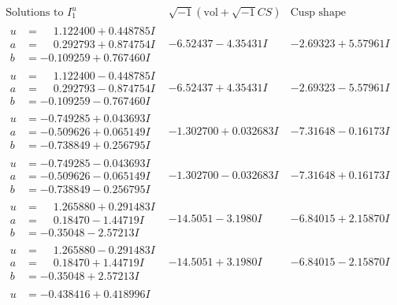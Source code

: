 \documentclass[1p]{elsarticle_modified}
\theoremstyle{definition}
\newcommand{\I}{\sqrt{-1}}
\begin{document}
$$\begin{array}{c|c|c}  
\text{Solutions to }I^u_{1}& \I (\text{vol} + \sqrt{-1}CS) & \text{Cusp shape}\\
 \hline 
\begin{aligned}
u &= \phantom{-}1.122400 + 0.448785 I \\
a &= \phantom{-}0.292793 + 0.874754 I \\
b &= -0.109259 + 0.767460 I\end{aligned}
 & -6.52437 - 4.35431 I & -2.69323 + 5.57961 I \\ \hline\begin{aligned}
u &= \phantom{-}1.122400 - 0.448785 I \\
a &= \phantom{-}0.292793 - 0.874754 I \\
b &= -0.109259 - 0.767460 I\end{aligned}
 & -6.52437 + 4.35431 I & -2.69323 - 5.57961 I \\ \hline\begin{aligned}
u &= -0.749285 + 0.043693 I \\
a &= -0.509626 + 0.065149 I \\
b &= -0.738849 + 0.256795 I\end{aligned}
 & -1.302700 + 0.032683 I & -7.31648 - 0.16173 I \\ \hline\begin{aligned}
u &= -0.749285 - 0.043693 I \\
a &= -0.509626 - 0.065149 I \\
b &= -0.738849 - 0.256795 I\end{aligned}
 & -1.302700 - 0.032683 I & -7.31648 + 0.16173 I \\ \hline\begin{aligned}
u &= \phantom{-}1.265880 + 0.291483 I \\
a &= \phantom{-}0.18470 - 1.44719 I \\
b &= -0.35048 - 2.57213 I\end{aligned}
 & -14.5051 - 3.1980 I & -6.84015 + 2.15870 I \\ \hline\begin{aligned}
u &= \phantom{-}1.265880 - 0.291483 I \\
a &= \phantom{-}0.18470 + 1.44719 I \\
b &= -0.35048 + 2.57213 I\end{aligned}
 & -14.5051 + 3.1980 I & -6.84015 - 2.15870 I \\ \hline\begin{aligned}
u &= -0.438416 + 0.418996 I \\

\end{aligned}
\end{array}$$
\end{document}
